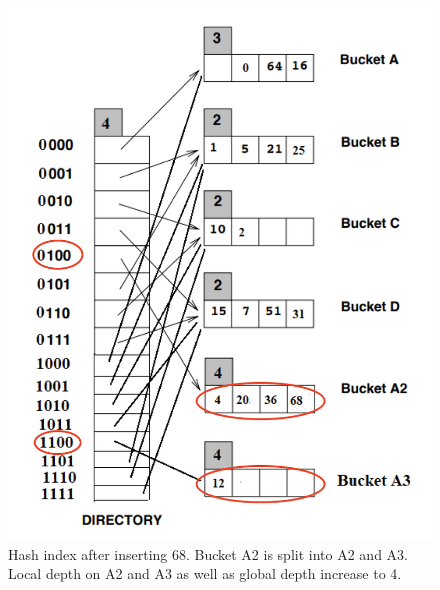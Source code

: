 \begin{figure}[H]
  \centering
  \includegraphics[width=0.9\linewidth]{figs/q2-5.png}
  \caption{Hash index after inserting 68.
    Bucket A2 is split into A2 and A3.
  Local depth on A2 and A3 as well as global depth increase to 4. }
  \label{fig:q2-5}
\end{figure}
